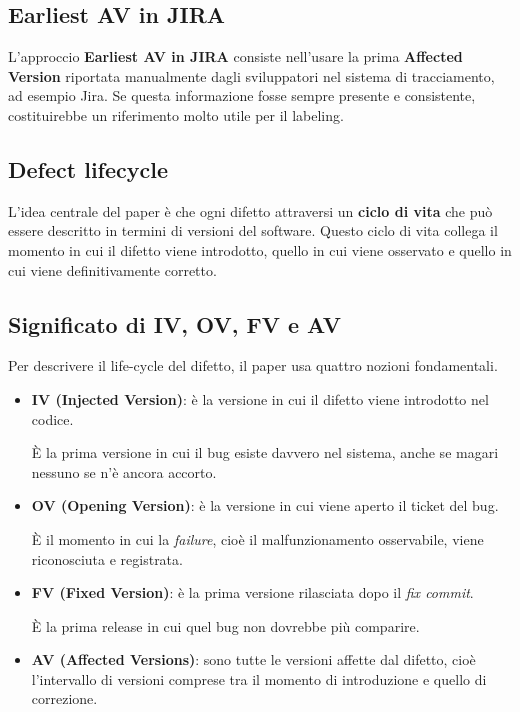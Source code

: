 \subsection{Earliest AV in JIRA}

L'approccio \textbf{Earliest AV in JIRA} consiste nell'usare la prima \textbf{Affected Version} riportata manualmente dagli sviluppatori nel sistema di tracciamento, ad esempio Jira. Se questa informazione fosse sempre presente e consistente, costituirebbe un riferimento molto utile per il labeling.

\subsection{Defect lifecycle}

L'idea centrale del paper è che ogni difetto attraversi un \textbf{ciclo di vita} che può essere descritto in termini di versioni del software. Questo ciclo di vita collega il momento in cui il difetto viene introdotto, quello in cui viene osservato e quello in cui viene definitivamente corretto.

\subsection{Significato di IV, OV, FV e AV}

Per descrivere il life-cycle del difetto, il paper usa quattro nozioni fondamentali.

\begin{itemize}
    \item \textbf{IV (Injected Version)}: è la versione in cui il difetto viene introdotto nel codice.
    \begin{notaprof}
    È la prima versione in cui il bug esiste davvero nel sistema, anche se magari nessuno se n'è ancora accorto.
    \end{notaprof}

    \item \textbf{OV (Opening Version)}: è la versione in cui viene aperto il ticket del bug.
    \begin{notaprof}
    È il momento in cui la \emph{failure}, cioè il malfunzionamento osservabile, viene riconosciuta e registrata.
    \end{notaprof}

    \item \textbf{FV (Fixed Version)}: è la prima versione rilasciata dopo il \emph{fix commit}.
    \begin{notaprof}
    È la prima release in cui quel bug non dovrebbe più comparire.
    \end{notaprof}

    \item \textbf{AV (Affected Versions)}: sono tutte le versioni affette dal difetto, cioè l'intervallo di versioni comprese tra il momento di introduzione e quello di correzione.
\end{itemize}


